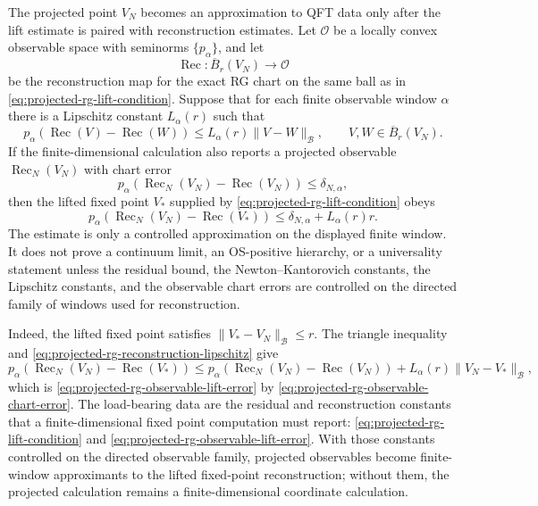 \begin{controlledapproximation}
\label{cap:projected-fixed-point-observable-approximants}
The projected point \(V_N\) becomes an approximation to QFT data only after
the lift estimate is paired with reconstruction estimates.  Let
\(\mathcal O\) be a locally convex observable space with seminorms
\(\{p_\alpha\}\), and let
\[
  \operatorname{Rec}:\overline B_r(V_N)\longrightarrow \mathcal O
\]
be the reconstruction map for the exact RG chart on the same ball as in
\eqref{eq:projected-rg-lift-condition}.  Suppose that for each finite
observable window \(\alpha\) there is a Lipschitz constant \(L_\alpha(r)\)
such that
\begin{equation}
  p_\alpha\!\left(\operatorname{Rec}(V)-\operatorname{Rec}(W)\right)
  \le
  L_\alpha(r)\|V-W\|_{\mathcal B},
  \qquad
  V,W\in\overline B_r(V_N).
  \label{eq:projected-rg-reconstruction-lipschitz}
\end{equation}
If the finite-dimensional calculation also reports a projected observable
\(\operatorname{Rec}_N(V_N)\) with chart error
\begin{equation}
  p_\alpha\!\left(\operatorname{Rec}_N(V_N)-\operatorname{Rec}(V_N)\right)
  \le \delta_{N,\alpha},
  \label{eq:projected-rg-observable-chart-error}
\end{equation}
then the lifted fixed point \(V_\ast\) supplied by
\eqref{eq:projected-rg-lift-condition} obeys
\begin{equation}
  p_\alpha\!\left(\operatorname{Rec}_N(V_N)-\operatorname{Rec}(V_\ast)\right)
  \le
  \delta_{N,\alpha}+L_\alpha(r)r .
  \label{eq:projected-rg-observable-lift-error}
\end{equation}
The estimate is only a controlled approximation on the displayed finite
window.  It does not prove a continuum limit, an OS-positive hierarchy, or a
universality statement unless the residual bound, the Newton--Kantorovich
constants, the Lipschitz constants, and the observable chart errors are
controlled on the directed family of windows used for reconstruction.
\end{controlledapproximation}

Indeed, the lifted fixed point satisfies \(\|V_\ast-V_N\|_{\mathcal B}\le r\).
The triangle inequality and
\eqref{eq:projected-rg-reconstruction-lipschitz} give
\[
  p_\alpha\!\left(\operatorname{Rec}_N(V_N)-\operatorname{Rec}(V_\ast)\right)
  \le
  p_\alpha\!\left(\operatorname{Rec}_N(V_N)-\operatorname{Rec}(V_N)\right)
  +
  L_\alpha(r)\|V_N-V_\ast\|_{\mathcal B},
\]
which is \eqref{eq:projected-rg-observable-lift-error} by
\eqref{eq:projected-rg-observable-chart-error}.  The load-bearing data are
the residual and reconstruction constants that a finite-dimensional fixed
point computation must report:
\eqref{eq:projected-rg-lift-condition} and
\eqref{eq:projected-rg-observable-lift-error}.  With those constants
controlled on the directed observable family, projected observables become
finite-window approximants to the lifted fixed-point reconstruction; without
them, the projected calculation remains a finite-dimensional coordinate
calculation.

